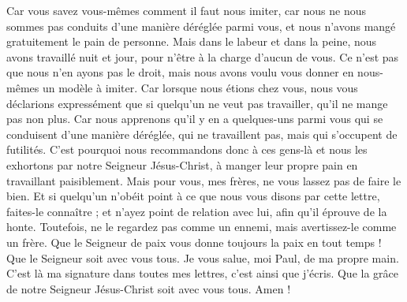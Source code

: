 \begin{multicols}{2}
Car vous savez vous-mêmes comment il faut nous imiter, car nous ne nous sommes pas conduits d’une manière déréglée parmi vous,
et nous n'avons mangé gratuitement le pain de personne. Mais dans le labeur et dans la peine, nous avons travaillé nuit et jour, pour n’être à la charge d’aucun de vous.
Ce n’est pas que nous n'en ayons pas le droit, mais nous avons voulu vous donner en nous-mêmes un modèle à imiter.
Car lorsque nous étions chez vous, nous vous déclarions expressément que si quelqu'un ne veut pas travailler, qu'il ne mange pas non plus.
Car nous apprenons qu'il y en a quelques-uns parmi vous qui se conduisent d'une manière déréglée, qui ne travaillent pas, mais qui s’occupent de futilités.
C’est pourquoi nous recommandons donc à ces gens-là et nous les exhortons par notre Seigneur Jésus-Christ, à manger leur propre pain en travaillant paisiblement.
Mais pour vous, mes frères, ne vous lassez pas de faire le bien.
Et si quelqu'un n'obéit point à ce que nous vous disons par cette lettre, faites-le connaître ; et n’ayez point de relation avec lui, afin qu’il éprouve de la honte.
Toutefois, ne le regardez pas comme un ennemi, mais avertissez-le comme un frère.
\TextTitle{[Conclusion]}
Que le Seigneur de paix vous donne toujours la paix en tout temps ! Que le Seigneur soit avec vous tous.
Je vous salue, moi Paul, de ma propre main. C’est là ma signature dans toutes mes lettres, c'est ainsi que j'écris.
Que la grâce de notre Seigneur Jésus-Christ soit avec vous tous. Amen !
\PPE{}
\end{multicols}
